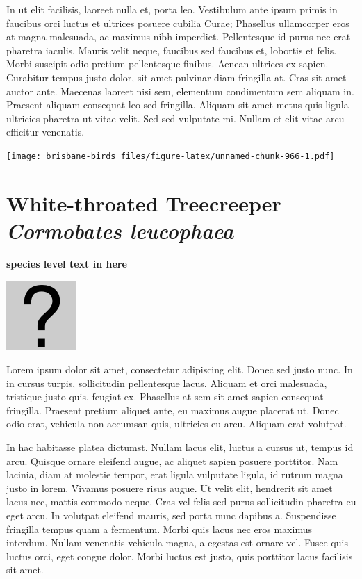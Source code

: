 \documentclass[]{book}
\let\origfigure\figure
\let\endorigfigure\endfigure
\renewenvironment{figure}[1][2] {
  \expandafter\origfigure\expandafter[H]
} {
  \endorigfigure
}
\begin{document}
In ut elit facilisis, laoreet nulla et, porta leo. Vestibulum ante ipsum
primis in faucibus orci luctus et ultrices posuere cubilia Curae;
Phasellus ullamcorper eros at magna malesuada, ac maximus nibh
imperdiet. Pellentesque id purus nec erat pharetra iaculis. Mauris velit
neque, faucibus sed faucibus et, lobortis et felis. Morbi suscipit odio
pretium pellentesque finibus. Aenean ultrices ex sapien. Curabitur
tempus justo dolor, sit amet pulvinar diam fringilla at. Cras sit amet
auctor ante. Maecenas laoreet nisi sem, elementum condimentum sem
aliquam in. Praesent aliquam consequat leo sed fringilla. Aliquam sit
amet metus quis ligula ultricies pharetra ut vitae velit. Sed sed
vulputate mi. Nullam et elit vitae arcu efficitur venenatis.

\begin{figure}
\centering
\texttt{[image: brisbane-birds\_files/figure-latex/unnamed-chunk-966-1.pdf]}
\caption{\label{fig:unnamed-chunk-966}insert figure caption}
\end{figure}

\section{\texorpdfstring{White-throated Treecreeper \emph{Cormobates
leucophaea}}{White-throated Treecreeper Cormobates leucophaea}}\label{white-throated-treecreeper-cormobates-leucophaea}

\textbf{species level text in here}

\begin{figure}
\centering
\includegraphics{assets/missing.png}
\caption{No image for species}
\end{figure}

Lorem ipsum dolor sit amet, consectetur adipiscing elit. Donec sed justo
nunc. In in cursus turpis, sollicitudin pellentesque lacus. Aliquam et
orci malesuada, tristique justo quis, feugiat ex. Phasellus at sem sit
amet sapien consequat fringilla. Praesent pretium aliquet ante, eu
maximus augue placerat ut. Donec odio erat, vehicula non accumsan quis,
ultricies eu arcu. Aliquam erat volutpat.

In hac habitasse platea dictumst. Nullam lacus elit, luctus a cursus ut,
tempus id arcu. Quisque ornare eleifend augue, ac aliquet sapien posuere
porttitor. Nam lacinia, diam at molestie tempor, erat ligula vulputate
ligula, id rutrum magna justo in lorem. Vivamus posuere risus augue. Ut
velit elit, hendrerit sit amet lacus nec, mattis commodo neque. Cras vel
felis sed purus sollicitudin pharetra eu eget arcu. In volutpat eleifend
mauris, sed porta nunc dapibus a. Suspendisse fringilla tempus quam a
fermentum. Morbi quis lacus nec eros maximus interdum. Nullam venenatis
vehicula magna, a egestas est ornare vel. Fusce quis luctus orci, eget
congue dolor. Morbi luctus est justo, quis porttitor lacus facilisis sit
amet.
\end{document}
